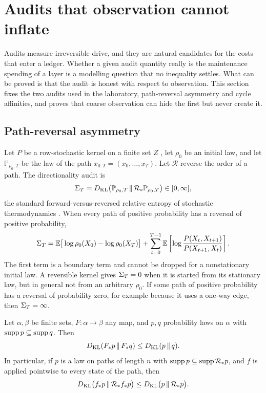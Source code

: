 \section{Audits that observation cannot inflate}\label{sec:audits}

Audits measure irreversible drive, and they are natural candidates for the costs that enter a ledger. Whether a given audit quantity really is the maintenance spending of a layer is a modelling question that no inequality settles. What can be proved is that the audit is honest with respect to observation. This section fixes the two audits used in the laboratory, path-reversal asymmetry and cycle affinities, and proves that coarse observation can hide the first but never create it.

\subsection{Path-reversal asymmetry}

Let \(P\) be a row-stochastic kernel on a finite set \(Z\) \cite{kemeny1960finite}, let \(\rho_0\) be an initial law, and let \(\mathbb P_{\rho_0,T}\) be the law of the path \(x_{0:T}=(x_0,\dots,x_T)\). Let \(\mathcal R\) reverse the order of a path. The directionality audit is
\[
\Sigma_T=D_{\mathrm{KL}}\big(\mathbb P_{\rho_0,T}\,\|\,\mathcal R_*\mathbb P_{\rho_0,T}\big)\in[0,\infty],
\]
the standard forward-versus-reversed relative entropy of stochastic thermodynamics \cite{kullback1951information,lebowitz1999gallavotti,seifert2005entropy}. When every path of positive probability has a reversal of positive probability,
\[
\Sigma_T=\mathbb{E}\big[\log\rho_0(X_0)-\log\rho_0(X_T)\big]+\sum_{t=0}^{T-1}\mathbb{E}\left[\log\frac{P(X_t,X_{t+1})}{P(X_{t+1},X_t)}\right].
\]
The first term is a boundary term and cannot be dropped for a nonstationary initial law. A reversible kernel gives \(\Sigma_T=0\) when it is started from its stationary law, but in general not from an arbitrary \(\rho_0\). If some path of positive probability has a reversal of probability zero, for example because it uses a one-way edge, then \(\Sigma_T=\infty\).

\begin{theorem}\label{thm:dpi}
Let \(\alpha,\beta\) be finite sets, \(F:\alpha\to\beta\) any map, and \(p,q\) probability laws on \(\alpha\) with \(\operatorname{supp} p\subseteq\operatorname{supp} q\). Then
\[
D_{\mathrm{KL}}(F_*p\,\|\,F_*q)\le D_{\mathrm{KL}}(p\,\|\,q).
\]
In particular, if \(p\) is a law on paths of length \(n\) with \(\operatorname{supp} p\subseteq\operatorname{supp}\mathcal R_*p\), and \(f\) is applied pointwise to every state of the path, then
\[
D_{\mathrm{KL}}\big(f_*p\,\|\,\mathcal R_*f_*p\big)\le D_{\mathrm{KL}}\big(p\,\|\,\mathcal R_*p\big).
\]
\end{theorem}

